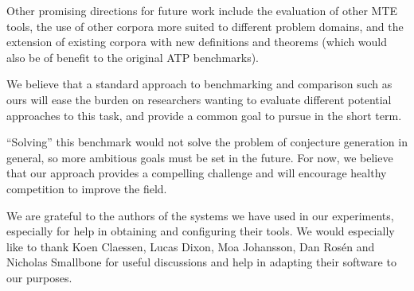 Other promising directions for future work include the evaluation of other MTE
tools, the use of other corpora more suited to different problem domains, and
the extension of existing corpora with new definitions and theorems (which would
also be of benefit to the original ATP benchmarks).

We believe that a standard approach to benchmarking and comparison such as ours
will ease the burden on researchers wanting to evaluate different potential
approaches to this task, and provide a common goal to pursue in the short term.

``Solving'' this benchmark would not solve the problem of conjecture generation
in general, so more ambitious goals must be set in the future. For now, we
believe that our approach provides a compelling challenge and will encourage
healthy competition to improve the field.

\begin{acknowledgements}
  We are grateful to the authors of the systems we have used in our experiments,
  especially for help in obtaining and configuring their tools. We would
  especially like to thank Koen Claessen, Lucas Dixon, Moa Johansson, Dan
  Ros\'{e}n and Nicholas Smallbone for useful discussions and help in adapting
  their software to our purposes.
\end{acknowledgements}





